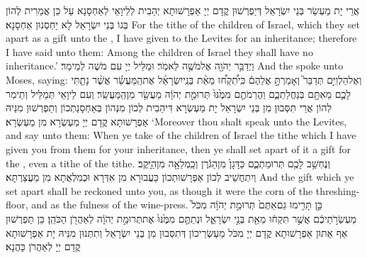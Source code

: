 {אֲרֵי יָת מַעְשַׂר בְּנֵי יִשְׂרָאֵל דְּיַפְרְשׁוּן קֳדָם יְיָ אַפְרָשׁוּתָא יְהַבִית לְלֵיוָאֵי לְאַחְסָנָא עַל כֵּן אֲמַרִית לְהוֹן בְּגוֹ בְּנֵי יִשְׂרָאֵל לָא יַחְסְנוּן אַחְסָנָא׃}
{For the tithe of the children of Israel, which they set apart as a gift unto the \lord, I have given to the Levites for an inheritance; therefore I have said unto them: Among the children of Israel they shall have no inheritance.’}{}
{וַיְדַבֵּ֥ר יְהֹוָ֖ה אֶל\maqqaf מֹשֶׁ֥ה לֵּאמֹֽר׃}
{וּמַלֵּיל יְיָ עִם מֹשֶׁה לְמֵימַר׃}
{And the \lord\space spoke unto Moses, saying:}{}
{וְאֶל\maqqaf הַלְוִיִּ֣ם תְּדַבֵּר֮ וְאָמַרְתָּ֣ אֲלֵהֶם֒ כִּֽי\maqqaf תִ֠קְח֠וּ מֵאֵ֨ת בְּנֵֽי\maqqaf יִשְׂרָאֵ֜ל אֶת\maqqaf הַֽמַּעֲשֵׂ֗ר אֲשֶׁ֨ר נָתַ֧תִּי לָכֶ֛ם מֵאִתָּ֖ם בְּנַחֲלַתְכֶ֑ם וַהֲרֵמֹתֶ֤ם מִמֶּ֙נּוּ֙ תְּרוּמַ֣ת יְהֹוָ֔ה מַעֲשֵׂ֖ר מִן\maqqaf הַֽמַּעֲשֵֽׂר׃}
{וְעִם לֵיוָאֵי תְּמַלֵּיל וְתֵימַר לְהוֹן אֲרֵי תִּסְּבוּן מִן בְּנֵי יִשְׂרָאֵל יָת מַעְשְׂרָא דִּיהַבִית לְכוֹן מִנְּהוֹן בְּאַחְסָנַתְכוֹן וְתַפְרְשׁוּן מִנֵּיהּ אַפְרָשׁוּתָא קֳדָם יְיָ מַעְשְׂרָא מִן מַעְשְׂרָא׃}
{‘Moreover thou shalt speak unto the Levites, and say unto them: When ye take of the children of Israel the tithe which I have given you from them for your inheritance, then ye shall set apart of it a gift for the \lord, even a tithe of the tithe.}{}
{וְנֶחְשַׁ֥ב לָכֶ֖ם תְּרוּמַתְכֶ֑ם כַּדָּגָן֙ מִן\maqqaf הַגֹּ֔רֶן וְכַֽמְלֵאָ֖ה מִן\maqqaf הַיָּֽקֶב׃}
{וְיִתְחֲשֵׁיב לְכוֹן אַפְרָשׁוּתְכוֹן כַּעֲבוּרָא מִן אִדְּרָא וּכְמִלְאֲתָא מִן מַעֲצַרְתָּא׃}
{And the gift which ye set apart shall be reckoned unto you, as though it were the corn of the threshing-floor, and as the fulness of the wine-press.}{}
{כֵּ֣ן תָּרִ֤ימוּ גַם\maqqaf אַתֶּם֙ תְּרוּמַ֣ת יְהֹוָ֔ה מִכֹּל֙ מַעְשְׂרֹ֣תֵיכֶ֔ם אֲשֶׁ֣ר תִּקְח֔וּ מֵאֵ֖ת בְּנֵ֣י יִשְׂרָאֵ֑ל וּנְתַתֶּ֤ם מִמֶּ֙נּוּ֙ אֶת\maqqaf תְּרוּמַ֣ת יְהֹוָ֔ה לְאַהֲרֹ֖ן הַכֹּהֵֽן׃}
{כֵּן תַּפְרְשׁוּן אַף אַתּוּן אַפְרָשׁוּתָא קֳדָם יְיָ מִכֹּל מַעְשְׂרֵיכוֹן דְּתִסְּבוּן מִן בְּנֵי יִשְׂרָאֵל וְתִתְּנוּן מִנֵּיהּ יָת אַפְרָשׁוּתָא קֳדָם יְיָ לְאַהֲרֹן כָּהֲנָא׃}

